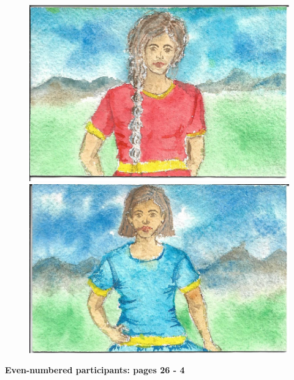 \documentclass[12pt]{article}
\begin{document}
\begin{figure}[h!]
\centering
\includegraphics[width=.38\paperwidth]{pictures/A}

\vspace*{1cm}

\includegraphics[width=.38\paperwidth]{pictures/L}
\end{figure}


\newpage

\thispagestyle{empty}

\vspace*{\fill}
\begingroup
\centering

{\bf \Huge Even-numbered participants: pages 26 - 4}

\endgroup
\vspace*{\fill}
\end{document}
